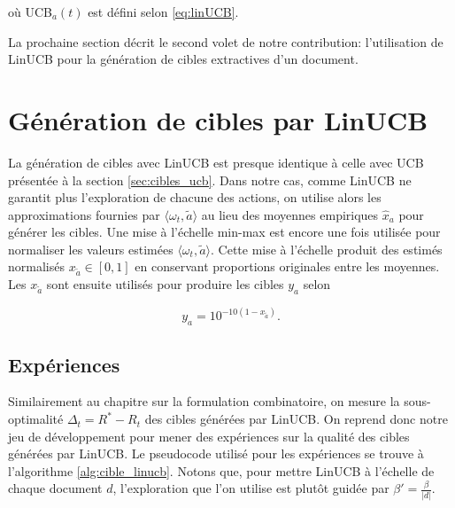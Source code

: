 où UCB$_a(t)$ est défini selon \eqref{eq:linUCB}.

La prochaine section décrit le second volet de notre contribution:
l'utilisation de LinUCB pour la génération de cibles extractives 
d'un document. 

\section{Génération de cibles par LinUCB}
\label{sec:cibles_linucb}

La génération de cibles avec LinUCB est presque identique
à celle avec UCB présentée à la section \ref{sec:cibles_ucb}.
Dans notre cas, comme LinUCB ne garantit plus l'exploration de chacune des 
actions, on utilise alors les approximations fournies par $\langle \omega_t, \tilde{a} \rangle$
au lieu des moyennes empiriques $\hat{x}_a$ pour générer les cibles.
Une mise à l'échelle min-max est encore une fois utilisée pour
normaliser les valeurs estimées $\langle \omega_t, \tilde{a} \rangle$.
Cette mise à l'échelle produit des estimés normalisés $x_{\tilde{a}} \in [0, 1]$
en conservant proportions originales entre les moyennes.
Les $x_{\tilde{a}}$ sont ensuite utilisés pour produire les cibles $y_a$ selon

\begin{equation}
    y_a = 10^{-10(1 - x_{\tilde{a}})}.
    \label{eq:cibles_linucb}
\end{equation}

\subsection{Expériences}

Similairement au chapitre sur la formulation combinatoire,
on mesure la sous-optimalité $\Delta_t = R^* - R_t$ des cibles générées
par LinUCB.
On reprend donc notre jeu de développement pour mener des expériences 
sur la qualité des cibles générées par LinUCB.
Le pseudocode utilisé pour les expériences se trouve à l'algorithme 
\ref{alg:cible_linucb}.
Notons que, pour mettre LinUCB à l'échelle de chaque document $d$, 
l'exploration que l'on utilise est plutôt guidée par $\beta' = \frac{\beta}{|d|}$.

